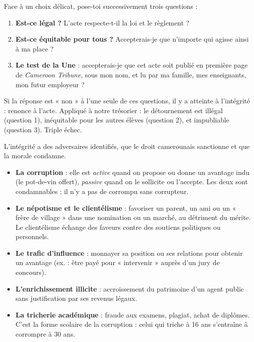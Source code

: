 \documentclass[11pt]{article}
\newcommand{\cle}[1]{{\popxbold\color{popdark}#1}}
\newcounter{popsec}
\newcounter{popsub}
\newcommand{\courssub}[1]{%
  \stepcounter{popsub}%
  \par\vspace{9pt}\noindent{\popxbold\fontsize{11.5}{13}\selectfont\color{popink}{\color{poporange}\thepopsec.\thepopsub}\hspace{6pt}#1}\par\nopagebreak\vspace{4pt}
}
\begin{document}
\begin{methode}
Face à un choix délicat, pose-toi successivement trois questions :
\begin{enumerate}
\item \textbf{Est-ce légal ?} L'acte respecte-t-il la loi et le règlement ?
\item \textbf{Est-ce équitable pour tous ?} Accepterais-je que n'importe qui agisse ainsi à ma place ?
\item \textbf{Le test de la Une} : accepterais-je que cet acte soit publié en première page de \emph{Cameroon Tribune}, sous mon nom, et lu par ma famille, mes enseignants, mon futur employeur ?
\end{enumerate}
Si la réponse est « non » à l'une seule de ces questions, il y a atteinte à l'intégrité : renonce à l'acte. Appliqué à notre trésorier : le détournement est illégal (question 1), inéquitable pour les autres élèves (question 2), et impubliable (question 3). Triple échec.
\end{methode}

\courssub{Les ennemis de l'intégrité}

L'intégrité a des adversaires identifiés, que le droit camerounais sanctionne et que la morale condamne.

\begin{itemize}
\item \textbf{La \cle{corruption}} : elle est \emph{active} quand on propose ou donne un avantage indu (le pot-de-vin offert), \emph{passive} quand on le sollicite ou l'accepte. Les deux sont condamnables : il n'y a pas de corrompu sans corrupteur.
\item \textbf{Le \cle{népotisme} et le \cle{clientélisme}} : favoriser un parent, un ami ou un « frère de village » dans une nomination ou un marché, au détriment du mérite. Le clientélisme échange des faveurs contre des soutiens politiques ou personnels.
\item \textbf{Le \cle{trafic d'influence}} : monnayer sa position ou ses relations pour obtenir un avantage (ex. : être payé pour « intervenir » auprès d'un jury de concours).
\item \textbf{L'\cle{enrichissement illicite}} : accroissement du patrimoine d'un agent public sans justification par ses revenus légaux.
\item \textbf{La \cle{tricherie académique}} : fraude aux examens, plagiat, achat de diplômes. C'est la forme scolaire de la corruption : celui qui triche à 16 ans s'entraîne à corrompre à 30 ans.
\end{itemize}
\end{document}

